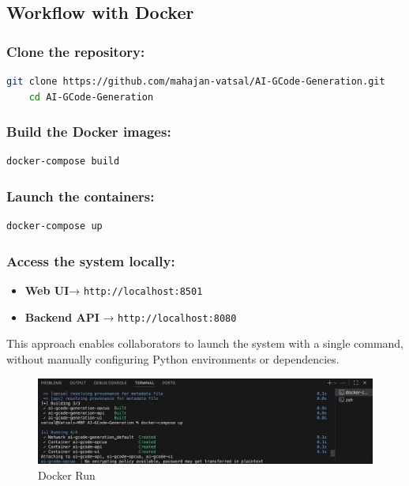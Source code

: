 \subsection{Workflow with Docker}
\subsubsection{Clone the repository:}

\begin{lstlisting}[language=bash,caption={Clone Repository}, label={lst:text}]
	git clone https://github.com/mahajan-vatsal/AI-GCode-Generation.git
	cd AI-GCode-Generation
\end{lstlisting}
		
\subsubsection{Build the Docker images:}

\begin{lstlisting}[language=bash,caption={Build Image}, label={lst:text}]
		docker-compose build
\end{lstlisting}

\subsubsection{Launch the containers:}

\begin{lstlisting}[language=bash,caption={Launch Container}, label={lst:text}]
		docker-compose up
\end{lstlisting}

\subsubsection{Access the system locally:}

 		\begin{itemize}
 		\item \textbf{Web UI}→ \texttt{http://localhost:8501}
 	\item \textbf{Backend API} → \texttt{http://localhost:8080}
 \end{itemize}
 
This approach enables collaborators to launch the system with a single command, without manually configuring Python environments or dependencies.

\begin{figure}
	\begin{center}
		\includegraphics[width=1\linewidth]{Images/dockerT.png}
		\caption{Docker Run}
		\label{DockerT} 
	\end{center}
\end{figure}

